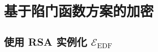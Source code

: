 \section{基于陷门函数方案的加密}\label{sec:11-4}

\begin{theorem}\label{theo:11-2}
	
\end{theorem}

\subsection{使用 RSA 实例化 $\mathcal{E}_\mathrm{EDF}$}\label{subsec:11-4-1}

\begin{theorem}\label{theo:11-3}
	
\end{theorem}